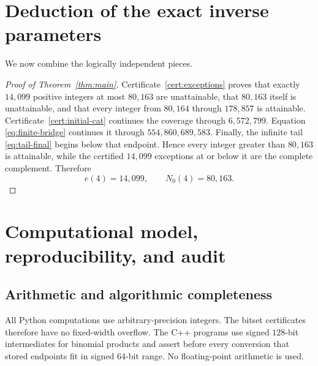 \documentclass[11pt]{article}
\theoremstyle{definition}
\theoremstyle{remark}
\begin{document}
\section{Deduction of the exact inverse parameters}

We now combine the logically independent pieces.

\begin{proof}[Proof of Theorem~\ref{thm:main}]
Certificate~\ref{cert:exceptions} proves that exactly $14{,}099$ positive
integers at most $80{,}163$ are unattainable, that $80{,}163$ itself is
unattainable, and that every integer from $80{,}164$ through $178{,}857$ is
attainable.  Certificate~\ref{cert:initial-cat} continues the coverage through
$6{,}572{,}799$.  Equation \eqref{eq:finite-bridge} continues it through
$554{,}860{,}689{,}583$.  Finally, the infinite tail
\eqref{eq:tail-final} begins below that endpoint.  Hence every integer greater
than $80{,}163$ is attainable, while the certified $14{,}099$ exceptions at or
below it are the complete complement.  Therefore
\[
  e(4)=14{,}099,
  \qquad
  N_0(4)=80{,}163.
\]
\end{proof}

\section{Computational model, reproducibility, and audit}

\subsection{Arithmetic and algorithmic completeness}

All Python computations use arbitrary-precision integers.  The bitset
certificates therefore have no fixed-width overflow.  The C++ programs use
signed $128$-bit intermediates for binomial products and assert before every
conversion that stored endpoints fit in signed $64$-bit range.  No
floating-point arithmetic is used.
\end{document}
